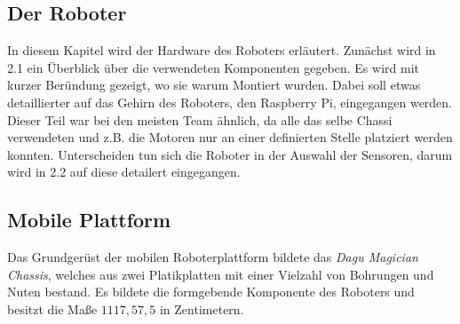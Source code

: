 \documentclass[12pt,a4paper,oneside]{article}
\begin{document}
\begin{spacing}{1.15}
\section{Der Roboter}

In diesem Kapitel wird der Hardware des Roboters erläutert. Zunächst wird in 2.1 ein Überblick über die verwendeten Komponenten gegeben. Es wird mit kurzer Beründung gezeigt, wo sie warum Montiert wurden. Dabei soll etwas detaillierter auf das Gehirn des Roboters, den Raspberry Pi, eingegangen werden. Dieser Teil war bei den meisten Team ähnlich, da alle das selbe Chassi verwendeten und z.B. die Motoren nur an einer definierten Stelle platziert werden konnten. Unterscheiden tun sich die Roboter in der Auswahl der Sensoren, darum wird in 2.2 auf diese detailert eingegangen. 

\subsection{Mobile Plattform}

Das Grundgerüst der mobilen Roboterplattform bildete das \textit{Dagu Magician Chassis}, welches aus zwei Platikplatten mit einer Vielzahl von Bohrungen und Nuten bestand. Es bildete die formgebende Komponente des Roboters und besitzt  die Maße $11 17,5 7,5$ in Zentimetern. 


\end{spacing}
\end{document}
